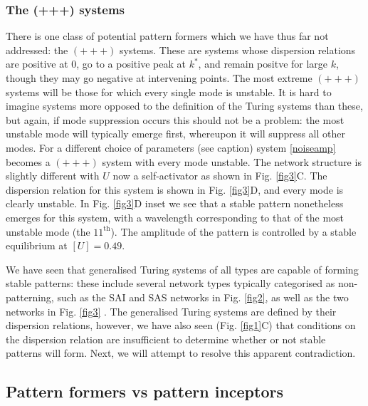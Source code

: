\subsubsection*{The (+++) systems}

There is one class of potential pattern formers which we have thus far not addressed: the $(+++)$ systems. These are systems whose dispersion relations are positive at $0$, go to a positive peak at $k^*$, and remain positve for large $k$, though they may go negative at intervening points. The most extreme $(+++)$ systems will be those for which every single mode is unstable. It is hard to imagine systems more opposed to the definition of the Turing systems than these, but again, if mode suppression occurs this should not be a problem: the most unstable mode will typically emerge first, whereupon it will suppress all other modes. For a different choice of parameters (see caption) system \eqref{noiseamp} becomes a $(+++)$ system with every mode unstable. The network structure is slightly different with $U$ now a self-activator as shown in Fig. \ref{fig3}C. The dispersion relation for this system is shown in Fig. \ref{fig3}D, and every mode is clearly unstable. In Fig. \ref{fig3}D inset we see that a stable pattern nonetheless emerges for this system, with a wavelength corresponding to that of the most unstable mode (the $11^\text{th}$). The amplitude of the pattern is controlled by a stable equilibrium at $[U]=0.49$.

We have seen that generalised Turing systems of all types are capable of forming stable patterns: these include several network types typically categorised as non-patterning, such as the SAI and SAS networks in Fig. \ref{fig2}, as well as the two networks in Fig. \ref{fig3} \cite{marcon2016high}. The generalised Turing systems are defined by their dispersion relations, however, we have also seen (Fig. \ref{fig1}C) that conditions on the dispersion relation are insufficient to determine whether or not stable patterns will form. Next, we will attempt to resolve this apparent contradiction.

\subsection*{Pattern formers vs pattern inceptors}

